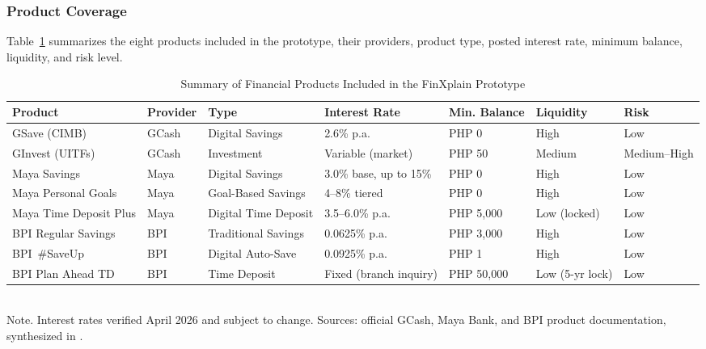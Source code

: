 \documentclass{icsthesis}
\begin{document}
\begin{mainmatter}
				\subsubsection{Product Coverage}

					Table~\ref{tab:products} summarizes the eight products included in the prototype, their providers, product type, posted interest rate, minimum balance, liquidity, and risk level.

					\begin{table}[ht]
					\vspace{4ex}
					\centering
					\caption{Summary of Financial Products Included in the FinXplain Prototype}
					\label{tab:products}
					\small
					\begin{tabular}{|p{1.3cm}|l|p{1.7cm}|p{1.5cm}|l|p{1.4cm}|p{1.2cm}|}
						\hline
						\textbf{Product} & \textbf{Provider} & \textbf{Type} & \textbf{Interest Rate} & \textbf{Min. Balance} & \textbf{Liquidity} & \textbf{Risk}\\
						\hline
						GSave (CIMB)             & GCash & Digital Savings        & 2.6\% p.a.                 & PHP 0      & High & Low         \\
						\hline
						GInvest (UITFs)          & GCash & Investment             & Variable (market)          & PHP 50     & Medium & Medium\newline--High \\
						\hline
						Maya Savings             & Maya  & Digital Savings        & 3.0\% base, up to 15\%     & PHP 0      & High & Low         \\
						\hline
						Maya Personal Goals      & Maya  & Goal-Based Savings     & 4--8\% tiered              & PHP 0      & High & Low        \\
						\hline
						Maya Time Deposit Plus   & Maya  & Digital Time Deposit   & 3.5--6.0\% p.a.            & PHP 5,000  & Low (locked) & Low   \\
						\hline
						BPI Regular Savings      & BPI   & Traditional Savings    & 0.0625\% p.a.              & PHP 3,000  & High & Low         \\
						\hline
						BPI\newline~\#SaveUp             & BPI   & Digital Auto-Save      & 0.0925\% p.a.              & PHP 1      & High & Low         \\
						\hline
						BPI Plan Ahead TD        & BPI   & Time Deposit           & Fixed (branch inquiry)     & PHP 50,000 & Low (5-yr lock) & Low\\
						\hline
					\end{tabular}
					\\[2pt]
					{\footnotesize Note. Interest rates verified April 2026 and subject to change. Sources: official GCash, Maya Bank, and BPI product documentation, synthesized in \cite{ref35}.}
					\vspace{4ex}
					\end{table}


\end{mainmatter}
\end{document}
